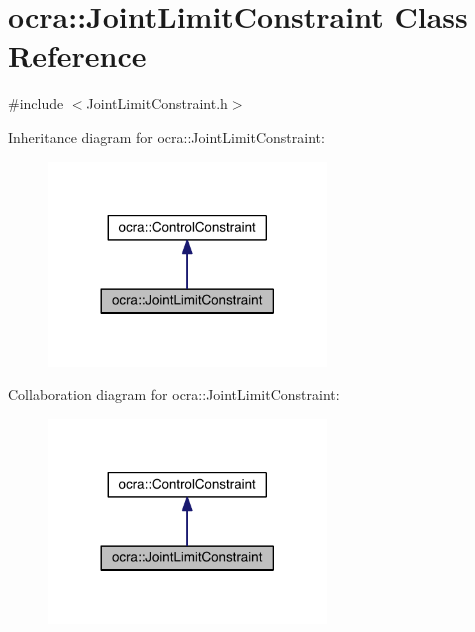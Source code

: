 \hypertarget{classocra_1_1JointLimitConstraint}{}\section{ocra\+:\+:Joint\+Limit\+Constraint Class Reference}
\label{classocra_1_1JointLimitConstraint}


{\ttfamily \#include $<$Joint\+Limit\+Constraint.\+h$>$}



Inheritance diagram for ocra\+:\+:Joint\+Limit\+Constraint\+:\nopagebreak
\begin{figure}[H]
\begin{center}
\leavevmode
\includegraphics[width=209pt]{d8/d70/classocra_1_1JointLimitConstraint__inherit__graph}
\end{center}
\end{figure}


Collaboration diagram for ocra\+:\+:Joint\+Limit\+Constraint\+:\nopagebreak
\begin{figure}[H]
\begin{center}
\leavevmode
\includegraphics[width=209pt]{d1/dd3/classocra_1_1JointLimitConstraint__coll__graph}
\end{center}
\end{figure}
